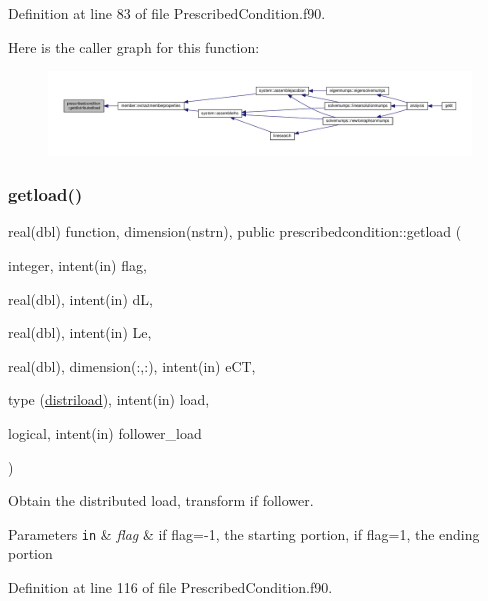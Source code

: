 Definition at line 83 of file Prescribed\+Condition.\+f90.

Here is the caller graph for this function\+:\nopagebreak
\begin{figure}[H]
\begin{center}
\leavevmode
\includegraphics[width=350pt]{namespaceprescribedcondition_a3f553c3c92903ed635511b07840774ff_icgraph}
\end{center}
\end{figure}
\mbox{\label{namespaceprescribedcondition_a6f624d814d4a2927fd9cc778231e6840}} 
\subsubsection{\texorpdfstring{getload()}{getload()}}
{\footnotesize\ttfamily real(dbl) function, dimension(nstrn), public prescribedcondition\+::getload (\begin{DoxyParamCaption}\item[{integer, intent(in)}]{flag,  }\item[{real(dbl), intent(in)}]{dL,  }\item[{real(dbl), intent(in)}]{Le,  }\item[{real(dbl), dimension(\+:,\+:), intent(in)}]{e\+CT,  }\item[{type (\hyperlink{structprescribedcondition_1_1distriload}{distriload}), intent(in)}]{load,  }\item[{logical, intent(in)}]{follower\+\_\+load }\end{DoxyParamCaption})}



Obtain the distributed load, transform if follower. 


\begin{DoxyParams}[1]{Parameters}
\mbox{\tt in}  & {\em flag} & if flag=-\/1, the starting portion, if flag=1, the ending portion \\
\hline
\end{DoxyParams}


Definition at line 116 of file Prescribed\+Condition.\+f90.

